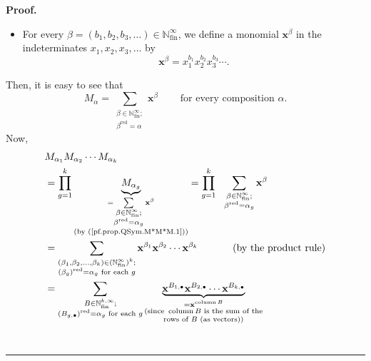 \documentclass
[numbers=enddot,12pt,final,onecolumn,notitlepage,abstracton]{scrartcl}%
\theoremstyle{definition}
\newenvironment{proof}[1][Proof]{\noindent\textbf{#1.} }{\ \rule{0.5em}{0.5em}}
\let\sumnonlimits\sum
\let\prodnonlimits\prod
\renewcommand{\sum}{\sumnonlimits\limits}
\renewcommand{\prod}{\prodnonlimits\limits}
\begin{document}
\begin{proof}
\begin{itemize}
\item For every $\beta=\left(  b_{1},b_{2},b_{3},\ldots\right)  \in
\mathbb{N}_{\operatorname*{fin}}^{\infty}$, we define a monomial
$\mathbf{x}^{\beta}$ in the indeterminates $x_{1},x_{2},x_{3},\ldots$ by%
\[
\mathbf{x}^{\beta}=x_{1}^{b_{1}}x_{2}^{b_{2}}x_{3}^{b_{3}}\cdots.
\]

\end{itemize}

Then, it is easy to see that%
\begin{equation}
M_{\alpha}=\sum_{\substack{\beta\in\mathbb{N}_{\operatorname*{fin}}^{\infty
};\\\beta^{\operatorname*{red}}=\alpha}}\mathbf{x}^{\beta}%
\ \ \ \ \ \ \ \ \ \ \text{for every composition }\alpha.
\label{pf.prop.QSym.M*M*M.1}%
\end{equation}
Now,%
\begin{align}
&  M_{\alpha_{1}}M_{\alpha_{2}}\cdots M_{\alpha_{k}}\nonumber\\
&  =\prod_{g=1}^{k}\underbrace{M_{\alpha_{g}}}_{\substack{=\sum
_{\substack{\beta\in\mathbb{N}_{\operatorname*{fin}}^{\infty};\\\beta
^{\operatorname*{red}}=\alpha_{g}}}\mathbf{x}^{\beta}\\\text{(by
(\ref{pf.prop.QSym.M*M*M.1}))}}}=\prod_{g=1}^{k}\ \ \sum_{\substack{\beta
\in\mathbb{N}_{\operatorname*{fin}}^{\infty};\\\beta^{\operatorname*{red}%
}=\alpha_{g}}}\mathbf{x}^{\beta}\nonumber\\
&  =\sum_{\substack{\left(  \beta_{1},\beta_{2},\ldots,\beta_{k}\right)
\in\left(  \mathbb{N}_{\operatorname*{fin}}^{\infty}\right)  ^{k};\\\left(
\beta_{g}\right)  ^{\operatorname*{red}}=\alpha_{g}\text{ for each }%
g}}\mathbf{x}^{\beta_{1}}\mathbf{x}^{\beta_{2}}\cdots\mathbf{x}^{\beta_{k}%
}\ \ \ \ \ \ \ \ \ \ \left(  \text{by the product rule}\right) \nonumber\\
&  =\sum_{\substack{B\in\mathbb{N}_{\operatorname*{fin}}^{k,\infty};\\\left(
B_{g,\bullet}\right)  ^{\operatorname*{red}}=\alpha_{g}\text{ for each }%
g}}\underbrace{\mathbf{x}^{B_{1,\bullet}}\mathbf{x}^{B_{2,\bullet}}%
\cdots\mathbf{x}^{B_{k,\bullet}}}_{\substack{=\mathbf{x}%
^{\operatorname*{column}B}\\\text{(since }\operatorname*{column}B\text{ is the
sum of the}\\\text{rows of }B\text{ (as vectors))}}}\nonumber\\

\end{align}
\end{proof}
\end{document}

